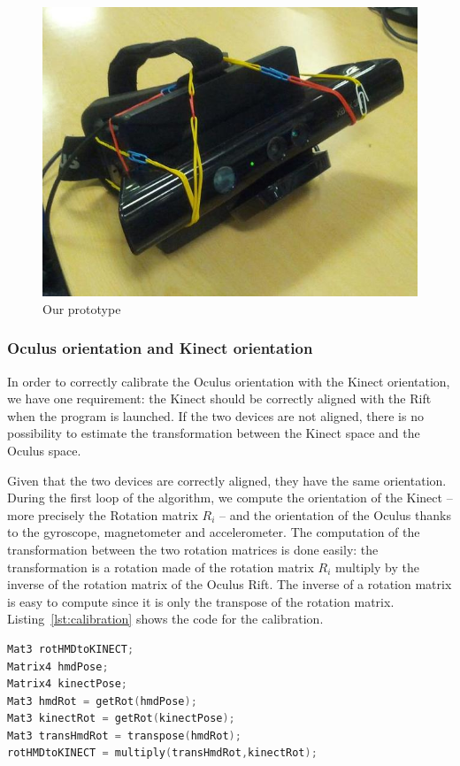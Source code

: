 \documentclass[12pt]{article}
\begin{document}
\begin{figure}[!h]
  \centering
  \includegraphics[scale=0.3]{Prototype.jpg}
  \caption{\label{fig:prototype} Our prototype}
\end{figure}

\subsubsection{Oculus orientation and Kinect orientation}
In order to correctly calibrate the Oculus orientation with the Kinect orientation, we have one requirement: the Kinect should be correctly aligned with the Rift when the program is launched. If the two devices are not aligned, there is no possibility to estimate the transformation between the Kinect space and the Oculus space.

Given that the two devices are correctly aligned, they have the same orientation. During the first loop of the algorithm, we compute the orientation of the Kinect -- more precisely the Rotation matrix $R_i$ -- and the orientation of the Oculus thanks to the gyroscope, magnetometer and accelerometer. The computation of the transformation between the two rotation matrices is done easily: the transformation is a rotation made of the rotation matrix $R_i$ multiply by the inverse of the rotation matrix of the Oculus Rift. The inverse of a rotation matrix is easy to compute since it is only the transpose of the rotation matrix. Listing~\ref{lst:calibration} shows the code for the calibration.

\begin{lstlisting}[language=C++, caption={C++ code for finding the transformation between the Kinect and the Rift}, label={lst:calibration}]
Mat3 rotHMDtoKINECT;
Matrix4 hmdPose;
Matrix4 kinectPose;
Mat3 hmdRot = getRot(hmdPose);
Mat3 kinectRot = getRot(kinectPose);
Mat3 transHmdRot = transpose(hmdRot);
rotHMDtoKINECT = multiply(transHmdRot,kinectRot);
\end{lstlisting}
\end{document}
